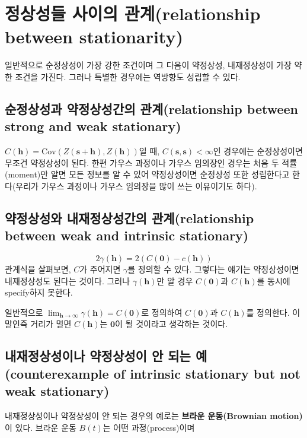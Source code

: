 \documentclass[b5paper,]{scrbook}
\theoremstyle{plain}
\theoremstyle{definition}
\numberwithin{equation}{section}
\begin{document}
\section{정상성들 사이의 관계(relationship between
stationarity)}\label{--relationship-between-stationarity}

일반적으로 순정상성이 가장 강한 조건이며 그 다음이 약정상성,
내재정상성이 가장 약한 조건을 가진다. 그러나 특별한 경우에는 역방향도
성립할 수 있다.

\subsection{순정상성과 약정상성간의 관계(relationship between strong and
weak
stationary)}\label{--relationship-between-strong-and-weak-stationary}

\(C(\mathbf{h})=\text{Cov}(Z(\mathbf{s}+\mathbf{h}), Z(\mathbf{h}))\)일
때, \(C(\mathbf{s},\mathbf{s}) < \infty\)인 경우에는 순정상성이면 무조건
약정상성이 된다. 한편 가우스 과정이나 가우스 임의장인 경우는 처음 두
적률(moment)만 알면 모든 정보를 알 수 있어 약정상성이면 순정상성 또한
성립한다고 한다(우리가 가우스 과정이나 가우스 임의장을 많이 쓰는
이유이기도 하다).

\subsection{약정상성와 내재정상성간의 관계(relationship between weak and
intrinsic
stationary)}\label{--relationship-between-weak-and-intrinsic-stationary}

\[2\gamma(\mathbf{h})=2(C(\mathbf{0})-c(\mathbf{h}))\] 관계식을
살펴보면, \(C\)가 주어지면 \(\gamma\)를 정의할 수 있다. 그렇다는 얘기는
약정상성이면 내재정상성도 된다는 것이다. 그러나 \(\gamma(\mathbf{h})\)만
알 경우 \(C(\mathbf{0})\)과 \(C(\mathbf{h})\)를 동시에 specify하지
못한다.

일반적으로
\(\lim_{\mathbf{h}\rightarrow \infty}\gamma(\mathbf{h})=C(\mathbf{0})\)로
정의하여 \(C(\mathbf{0})\)과 \(C(\mathbf{h})\)를 정의한다. 이 말인즉
거리가 멀면 \(C(\mathbf{h})\)는 \(\mathbf{0}\)이 될 것이라고 생각하는
것이다.

\subsection{내재정상성이나 약정상성이 안 되는 예(counterexample of
intrinsic stationary but not weak
stationary)}\label{----counterexample-of-intrinsic-stationary-but-not-weak-stationary}

내재정상성이나 약정상성이 안 되는 경우의 예로는 \textbf{브라운
운동(Brownian motion)}이 있다. 브라운 운동 \(B(t)\)는 어떤
과정(process)이며
\end{document}
